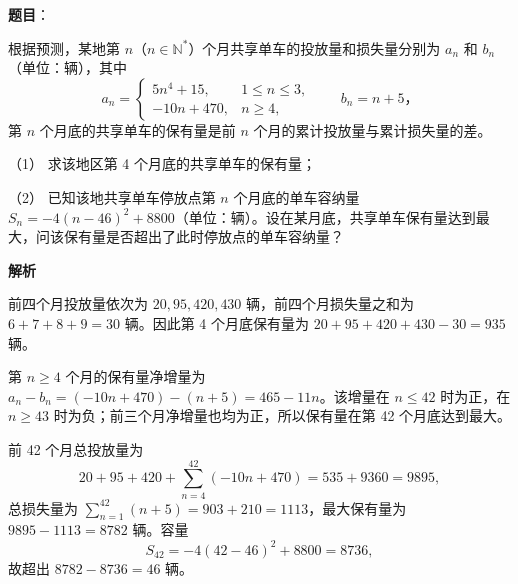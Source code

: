 \begin{answer}

\textbf{题目}：

根据预测，某地第 $n$（$n\in\mathbb N^*$）个月共享单车的投放量和损失量分别为 $a_n$ 和 $b_n$（单位：辆），其中
\nopagebreak[4]
\[
a_n=
\begin{cases}
5n^4+15,&1\leqslant n\leqslant3,\\
-10n+470,&n\geqslant4,
\end{cases}
\qquad b_n=n+5\text{，}
\]
第 $n$ 个月底的共享单车的保有量是前 $n$ 个月的累计投放量与累计损失量的差。

（1） 求该地区第 4 个月底的共享单车的保有量；

（2） 已知该地共享单车停放点第 $n$ 个月底的单车容纳量 $S_n=-4(n-46)^2+8800$（单位：辆）。设在某月底，共享单车保有量达到最大，问该保有量是否超出了此时停放点的单车容纳量？

\textbf{解析}


前四个月投放量依次为 $20,95,420,430$ 辆，前四个月损失量之和为 $6+7+8+9=30$ 辆。因此第 4 个月底保有量为 $20+95+420+430-30=935$ 辆。


第 $n\geqslant4$ 个月的保有量净增量为 $a_n-b_n=(-10n+470)-(n+5)=465-11n$。该增量在 $n\leqslant42$ 时为正，在 $n\geqslant43$ 时为负；前三个月净增量也均为正，所以保有量在第 42 个月底达到最大。

前 42 个月总投放量为
\nopagebreak[4]
\[
20+95+420+\sum_{n=4}^{42}(-10n+470)=535+9360=9895,
\]
总损失量为 $\sum_{n=1}^{42}(n+5)=903+210=1113$，最大保有量为 $9895-1113=8782$ 辆。容量
\nopagebreak[4]
\[
S_{42}=-4(42-46)^2+8800=8736,
\]
故超出 $8782-8736=46$ 辆。



\end{answer}
